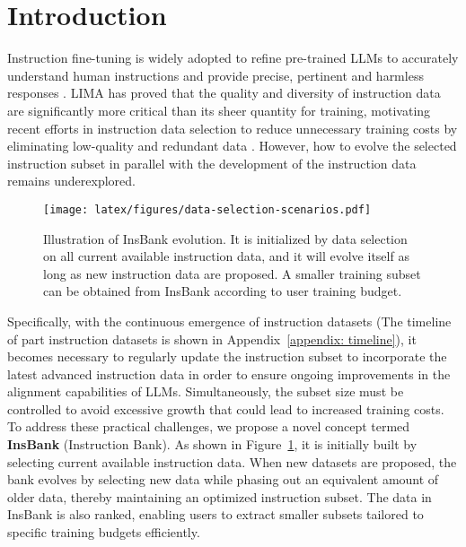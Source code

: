 \section{Introduction}

Instruction fine-tuning is widely adopted to refine pre-trained LLMs to accurately understand human instructions and provide precise, pertinent and harmless responses \citep{collection-flan-2022, ds-survey}. LIMA \citep{ift-lima} has proved that the quality and diversity of instruction data are significantly more critical than its sheer quantity for training, motivating recent efforts in instruction data selection to reduce unnecessary training costs by eliminating low-quality and redundant data \citep{ds-survey}. However, how to evolve the selected instruction subset in parallel with the development of the instruction data remains underexplored.

\begin{figure}[t]
\begin{center}
\texttt{[image: latex/figures/data-selection-scenarios.pdf]}
\end{center}
\caption{Illustration of InsBank evolution. It is initialized by data selection on all current available instruction data, and it will evolve itself as long as new instruction data are proposed. A smaller training subset can be obtained from InsBank according to user training budget.} 
\label{fig: data selection}
\end{figure}


Specifically, with the continuous emergence of instruction datasets (The timeline of part instruction datasets is shown in Appendix~\ref{appendix: timeline}), it becomes necessary to regularly update the instruction subset to incorporate the latest advanced instruction data in order to ensure ongoing improvements in the alignment capabilities of LLMs. Simultaneously, the subset size must be controlled to avoid excessive growth that could lead to increased training costs. To address these practical challenges, we propose a novel concept termed \textbf{InsBank} (Instruction Bank). As shown in Figure~\ref{fig: data selection}, it is initially built by selecting current available instruction data. When new datasets are proposed, the bank evolves by selecting new data while phasing out an equivalent amount of older data, thereby maintaining an optimized instruction subset. The data in InsBank is also ranked, enabling users to extract smaller subsets tailored to specific training budgets efficiently.

